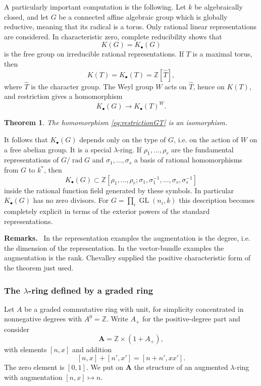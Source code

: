 \documentclass[14pt]{extarticle}
\newcommand{\ZZ}{\mathbb Z}
\newcommand{\GL}{\operatorname{GL}}
\newcommand{\rad}{\operatorname{rad}}
\newcommand{\wh}[1]{\widehat{#1}}
\newenvironment{remarks}{\par\medskip\noindent\textbf{Remarks.}\ }{\par\medskip}
\newtheorem*{theorem*}{Theorem}
\begin{document}
A particularly important computation is the following. Let $k$ be algebraically closed, and let $G$ be a connected affine algebraic group which is globally reductive, meaning that its radical is a torus. Only rational linear representations are considered. In characteristic zero, complete reducibility shows that
\[
   K(G)=K_{\bullet}(G)
\]
is the free group on irreducible rational representations. If $T$ is a maximal torus, then
\[
   K(T)=K_{\bullet}(T)=\ZZ[\wh T],
\]
where $\wh T$ is the character group. The Weyl group $W$ acts on $\wh T$, hence on $K(T)$, and restriction gives a homomorphism
\begin{equation}\label{eq:restrictionGT}
   K_{\bullet}(G)\to K_{\bullet}(T)^W.
\end{equation}

\begin{theorem*}
The homomorphism \eqref{eq:restrictionGT} is an isomorphism.
\end{theorem*}

It follows that $K_{\bullet}(G)$ depends only on the type of $G$, i.e. on the action of $W$ on a free abelian group. It is a special $\lambda$-ring. If $\rho_1,\ldots,\rho_r$ are the fundamental representations of $G/\rad G$ and $\sigma_1,\ldots,\sigma_s$ a basis of rational homomorphisms from $G$ to $k^*$, then
\[
K_{\bullet}(G)\subset
\ZZ[\rho_1,\ldots,\rho_r;
      \sigma_1,\sigma_1^{-1},\ldots,\sigma_s,\sigma_s^{-1}]
\]
inside the rational function field generated by these symbols. In particular $K_{\bullet}(G)$ has no zero divisors. For $G=\prod_i\GL(n_i,k)$ this description becomes completely explicit in terms of the exterior powers of the standard representations.

\begin{remarks}
In the representation examples the augmentation is the degree, i.e. the dimension of the representation. In the vector-bundle examples the augmentation is the rank. Chevalley supplied the positive characteristic form of the theorem just used.
\end{remarks}

\subsubsection{The $\lambda$-ring defined by a graded ring}

Let $A$ be a graded commutative ring with unit, for simplicity concentrated in nonnegative degrees with $A^0=\ZZ$. Write $A_+$ for the positive-degree part and consider
\[
   \mathbf A=\ZZ\times(1+A_+),
\]
with elements $[n,x]$ and addition
\[
   [n,x]+[n',x']=[n+n',xx'].
\]
The zero element is $[0,1]$. We put on $\mathbf A$ the structure of an augmented $\lambda$-ring with augmentation $[n,x]\mapsto n$.
\end{document}
